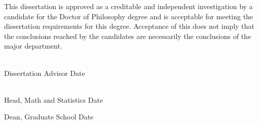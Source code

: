 \documentclass[SDSUThesis.tex]{subfiles}
\begin{document}
\begin{center}
\yourtitle
\vspace{0.5in}
\end{center}

\par This dissertation is approved as a creditable and independent investigation by a 
candidate for the Doctor of Philosophy degree and is acceptable for 
meeting the dissertation requirements for this degree. Acceptance of this does not imply 
that the conclusions reached by the candidates are necessarily the conclusions of the 
major department.

\vspace{1.5in}

\singlespacing

\hspace*{\fill}\underline{$~~~~~~~~~~~~~~~~~~~~~~~~~~~~~~~~~~~~~~~~~~~~~~~~~~~~$}\\
\hspace*{194bp}\youradvisor\\
\hspace*{\fill}Dissertation Advisor \hspace*{68bp}Date

\vspace{1in}

\hspace*{\fill}\underline{$~~~~~~~~~~~~~~~~~~~~~~~~~~~~~~~~~~~~~~~~~~~~~~~~~~~~$}\\
\hspace*{194bp}\departmenthead\\
\hspace*{\fill}Head, Math and Statistics \hspace*{39bp}Date

\vspace{1in}

\hspace*{\fill}\underline{$~~~~~~~~~~~~~~~~~~~~~~~~~~~~~~~~~~~~~~~~~~~~~~~~~~~~$}\\
\hspace*{194bp}Dean, Graduate School \hspace*{54bp}Date
\end{document}
